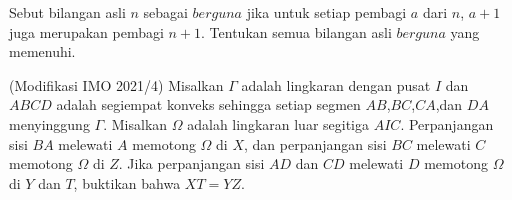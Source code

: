 \documentclass[11pt]{scrartcl}
\begin{document}
	\newpage
	\begin{soalbaru}
	Sebut bilangan asli $n$ sebagai $berguna$ jika untuk setiap pembagi $a$ dari $n$, $a+1$ juga merupakan pembagi $n+1$. Tentukan semua bilangan asli $berguna$ yang memenuhi.
	\end{soalbaru}
	
	\begin{soalbaru}
	(Modifikasi IMO 2021/4) Misalkan $\Gamma$ adalah lingkaran dengan pusat $I$ dan $ABCD$ adalah segiempat konveks sehingga setiap segmen $AB$,$BC$,$CA$,dan $DA$ menyinggung $\Gamma$. Misalkan $\Omega$ adalah lingkaran luar segitiga $AIC$. Perpanjangan sisi $BA$ melewati $A$ memotong $\Omega$ di $X$, dan perpanjangan sisi $BC$ melewati $C$ memotong $\Omega $ di $Z$. Jika perpanjangan sisi $AD$ dan $CD$ melewati $D$ memotong $\Omega$ di $Y$ dan $T$, buktikan bahwa $XT=YZ$.
	\end{soalbaru}
\end{document}
